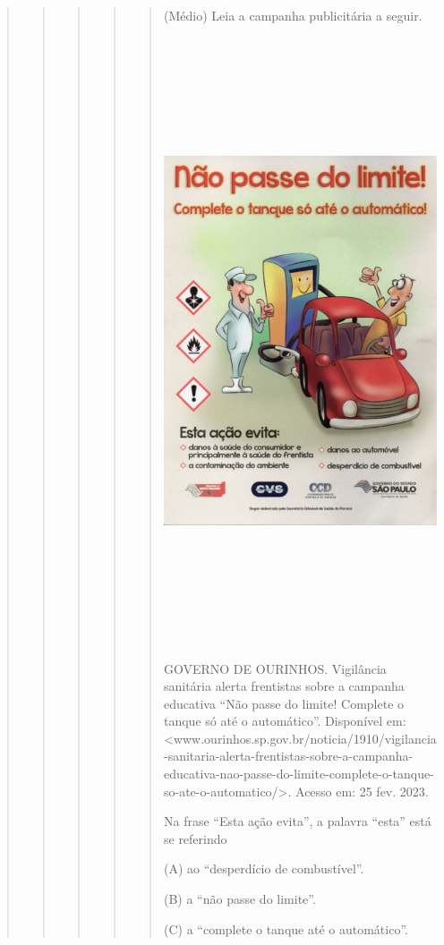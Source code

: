 \begin{quote}
\begin{quote}
\begin{quote}
\begin{quote}
\begin{quote}
(Médio) Leia a campanha publicitária a seguir.

\includegraphics[width=5.20833in,height=7.05556in]{media/image35.jpeg}

GOVERNO DE OURINHOS. Vigilância sanitária alerta frentistas sobre a
campanha educativa ``Não passe do limite! Complete o tanque só até o
automático''. Disponível em:
\textless{}www.ourinhos.sp.gov.br/noticia/1910/vigilancia-sanitaria-alerta-frentistas-sobre-a-campanha-educativa-nao-passe-do-limite-complete-o-tanque-so-ate-o-automatico/\textgreater{}.
Acesso em: 25 fev. 2023.

Na frase ``Esta ação evita'', a palavra ``esta'' está se referindo

(A) ao ``desperdício de combustível''.

(B) a ``não passe do limite''.

(C) a ``complete o tanque até o automático''.


\end{quote}
\end{quote}
\end{quote}
\end{quote}
\end{quote}
